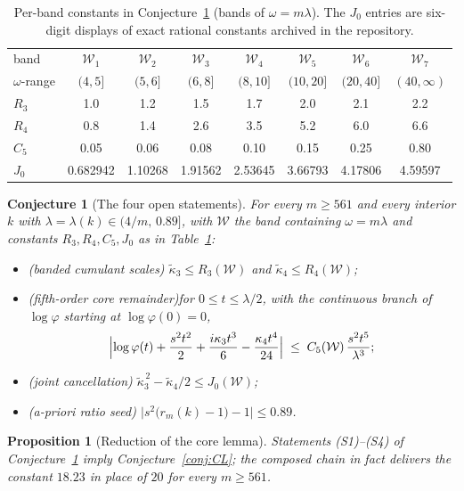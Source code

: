 \documentclass[11pt]{amsart}
\theoremstyle{plain}
\newtheorem{proposition}[theorem]{Proposition}
\newtheorem{conjecture}[theorem]{Conjecture}
\theoremstyle{definition}
\theoremstyle{remark}
\begin{document}
\begin{table}[htbp]
\centering
\caption{Per-band constants in Conjecture~\ref{conj:S} (bands of
$\omega=m\lambda$). The $J_0$ entries are six-digit displays of exact
rational constants archived in the repository.}
\label{tab:CLbands}
\small
\begin{tabular}{@{}lccccccc@{}}
\toprule
band & $\mathcal W_1$ & $\mathcal W_2$ & $\mathcal W_3$ & $\mathcal W_4$ & $\mathcal W_5$ & $\mathcal W_6$ & $\mathcal W_7$ \\
$\omega$-range & $(4,5]$ & $(5,6]$ & $(6,8]$ & $(8,10]$ & $(10,20]$ & $(20,40]$ & $(40,\infty)$ \\
\midrule
$R_3$ & 1.0 & 1.2 & 1.5 & 1.7 & 2.0 & 2.1 & 2.2 \\
$R_4$ & 0.8 & 1.4 & 2.6 & 3.5 & 5.2 & 6.0 & 6.6 \\
$C_5$ & 0.05 & 0.06 & 0.08 & 0.10 & 0.15 & 0.25 & 0.80 \\
$J_0$ & 0.682942 & 1.10268 & 1.91562 & 2.53645 & 3.66793 & 4.17806 & 4.59597 \\
\bottomrule
\end{tabular}
\end{table}

\begin{conjecture}[The four open statements]
\label{conj:S}
For every $m\ge561$ and every interior $k$ with
$\lambda=\lambda(k)\in(4/m,\,0.89]$, with $\mathcal W$ the band containing
$\omega=m\lambda$ and constants $R_3,R_4,C_5,J_0$ as in
Table~\ref{tab:CLbands}:
\begin{itemize}
\item[(S1)] \emph{(banded cumulant scales)}\quad
$\tilde\kappa_3\le R_3(\mathcal W)$ and $\tilde\kappa_4\le R_4(\mathcal W)$;
\item[(S2)] \emph{(fifth-order core remainder)}\quad for
$0\le t\le\lambda/2$, with the continuous branch of $\log\varphi$
starting at $\log\varphi(0)=0$,
\[
\Bigl|\log\varphi(t)+\frac{s^2t^2}{2}+\frac{i\kappa_3t^3}{6}
-\frac{\kappa_4t^4}{24}\Bigr| \;\le\;
C_5(\mathcal W)\,\frac{s^2t^5}{\lambda^3};
\]
\item[(S3)] \emph{(joint cancellation)}\quad
$\tilde\kappa_3^{\,2}-\tilde\kappa_4/2\le J_0(\mathcal W)$;
\item[(S4)] \emph{(a-priori ratio seed)}\quad
$\bigl|s^2\bigl(r_m(k)-1\bigr)-1\bigr|\le0.89$.
\end{itemize}
\end{conjecture}

\begin{proposition}[Reduction of the core lemma]
\label{prop:CLred}
Statements (S1)--(S4) of Conjecture~\ref{conj:S} imply
Conjecture~\ref{conj:CL}; the composed chain in fact delivers the
constant $18.23$ in place of $20$ for every $m\ge561$.
\end{proposition}
\end{document}
